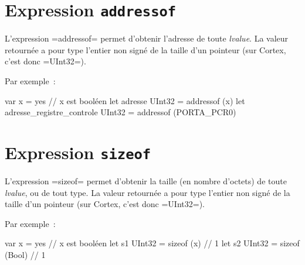 \section{Expression \texttt{addressof}}


L'expression \omnibus=addressof= permet d'obtenir l'adresse de toute \emph{lvalue}. La valeur retournée a pour type l'entier non signé de la taille d'un pointeur (sur Cortex, c'est donc \omnibus=UInt32=).

Par exemple~:
\begin{OMNIBUS}
var x = yes // x est booléen
let adresse UInt32 = addressof (x)
let adresse_registre_controle UInt32 = addressof (PORTA_PCR0)
\end{OMNIBUS}




\section{Expression \texttt{sizeof}}


L'expression \omnibus=sizeof= permet d'obtenir la taille (en nombre d'octets) de toute \emph{lvalue}, ou de tout type. La valeur retournée a pour type l'entier non signé de la taille d'un pointeur (sur Cortex, c'est donc \omnibus=UInt32=).

Par exemple~:
\begin{OMNIBUS}
var x = yes // x est booléen
let s1 UInt32 = sizeof (x) // 1
let s2 UInt32 = sizeof (Bool) // 1
\end{OMNIBUS}

